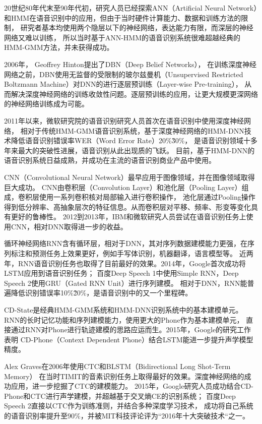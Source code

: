 20世纪80年代末至90年代初，研究人员已经探索ANN（Artificial Neural Network）和HMM在语音识别中的应用，但由于当时硬件计算能力、数据和训练方法的限制，
研究者基本均使用两个隐层以下的神经网络，表达能力有限，而深层的神经网络又难以训练，
所以当时基于ANN-HMM的语音识别系统很难超越经典的HMM-GMM方法，并未获得成功。

2006年， Geoffrey Hinton提出了DBN（Deep Belief Networks），
在训练深度神经网络之前，DBN使用无监督的受限制的玻尔兹曼机（Unsupervised Restricted Boltzmann Machine）对DNN的进行逐层预训练（Layer-wise Pre-training），
从而解决深度神经网络的训练收敛性问题。逐层预训练的应用，让更大规模更深网络的神经网络训练成为可能。

2011年以来，微软研究院的语音识别研究人员首次在语音识别中使用深度神经网络，
相对于传统HMM-GMM语音识别系统，基于深度神经网络的HMM-DNN技术降低语音识别错误率WER（Word Error Rate）20\%\~30\%，
是语音识别领域十多年来最大的突破性进展，语音识别从此出现质的飞跃。
目前，基于HMM-DNN的语音识别系统日益成熟，并成功在主流的语音识别商业产品中使用。


CNN（Convolutional Neural Network）最早应用于图像领域，并在图像领域取得巨大成功。
CNN由卷积层（Convolution Layer）和池化层（Pooling Layer）组成，卷积层使用一系列卷积核对局部输入进行卷积操作，
池化层通过Pooling操作得到低分辨率、高抽象层次的特征信息。从而卷积层对平移、频率、形变等变化具有更好的鲁棒性。
2012到2013年，IBM和微软研究人员尝试在语音识别任务上使用CNN，相对DNN取得进一步的收益。

循环神经网络RNN含有循环层，相对于DNN，其对序列数据建模能力更强，在序列标注和预测任务上效果更好，例如手写体识别，机器翻译，语言模型等。
近两年，RNN语音识别任务也取得了目前最好的效果。2014年，Google首次成功将LSTM应用到语音识别任务；
百度Deep Speech 1中使用Simple RNN，Deep Speech 2使用GRU（Gated RNN Unit）进行序列建模。
相对于DNN，RNN能普遍降低识别错误率10\%\~20\%，是语音识别中的又一个里程碑。

CD-State是经典HMM-GMM系统和HMM-DNN识别系统中的基本建模单元。RNN的长时记忆功能和序列建模能力，使用更大的Phone作为基本建模单元，
直接通过RNN对Phone进行轨迹建模的思路应运而生。2015年，Google的研究工作表明
CD-Phone（Context Dependent Phone）结合LSTM能进一步提升声学模型精度。

Alex Graves在2006年使用CTC和BLSTM（Bidirectional Long Shot-Term Memory）
在当时TIMIT的音素识别任务上取得最好的效果。深度神经网络的成功应用，进一步挖掘了CTC的建模能力。
2015年，Google研究人员成功结合CD-Phone和CTC进行声学建模，并超越基于交叉熵CE的识别系统；
百度Deep Speech 2直接以CTC作为训练准则，并结合多种深度学习技术，
成功将自己系统的语音识别率提升至90\%，并被MIT科技评论评为“2016年十大突破技术“之一。

